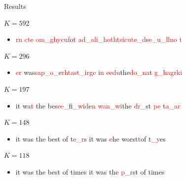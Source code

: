\documentclass{beamer}
\begin{document}
\begin{frame}{Results}

\begin{block}{$K=592$}
\begin{itemize}
\item \textcolor{red}{rn} \textcolor{red}{cte} \textcolor{red}{om\_ghycuf}o\textcolor{red}{t} \textcolor{red}{ad\_ali\_hothtsicute\_d}s\textcolor{red}{e\_u\_llno t}
\end{itemize}
\end{block}

\begin{block}{$K=296$}
\begin{itemize}
\item \textcolor{red}{er} was\textcolor{red}{sap\_o\_}e\textcolor{red}{rhtast\_}i\textcolor{red}{rge} i\textcolor{red}{n} \textcolor{red}{eedu}the\textcolor{red}{do\_na}t \textcolor{red}{g\_hagrki}
\end{itemize}
\end{block}

\begin{block}{$K=197$}
\begin{itemize}
\item it wa\textcolor{red}{t} the bes\textcolor{red}{ee\_}f\textcolor{red}{i\_w}i\textcolor{red}{d}e\textcolor{red}{n} \textcolor{red}{wan\_wi}the \textcolor{red}{dr\_}st \textcolor{red}{pe} t\textcolor{red}{a\_ar}
\end{itemize}
\end{block}

\begin{block}{$K=148$}
\begin{itemize}
\item it was the best of t\textcolor{red}{e\_r}s it was \textcolor{red}{e}he worst\textcolor{red}{t}of t\textcolor{red}{\_y}es
\end{itemize}
\end{block}

\begin{block}{$K=118$}
\begin{itemize}
\item it was the best of times it was the \textcolor{red}{p\_r}st of times
\end{itemize}
\end{block}

\end{frame}

\end{document}
